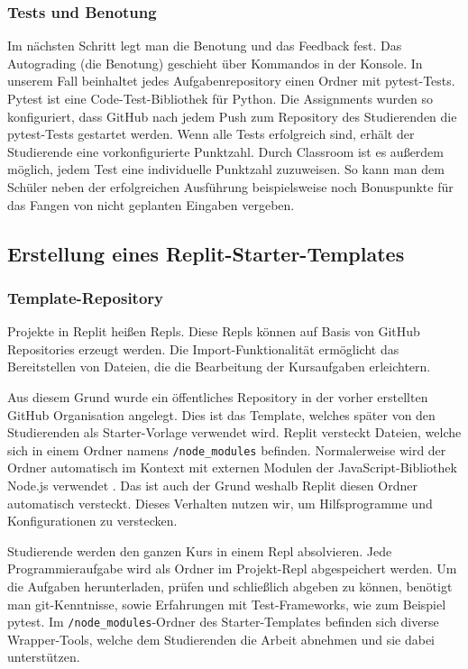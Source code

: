 \subsubsection{Tests und Benotung}
Im nächsten Schritt legt man die Benotung und das Feedback fest. Das Autograding
(die Benotung) geschieht über Kommandos in der Konsole. In unserem Fall
beinhaltet jedes Aufgabenrepository einen Ordner mit pytest-Tests. Pytest ist
eine Code-Test-Bibliothek für Python. Die Assignments wurden so konfiguriert,
dass GitHub nach jedem Push zum Repository des Studierenden die pytest-Tests
gestartet werden. Wenn alle Tests erfolgreich sind, erhält der Studierende eine
vorkonfigurierte Punktzahl. Durch Classroom ist es außerdem möglich, jedem
Test eine individuelle Punktzahl zuzuweisen. So kann man dem Schüler neben der erfolgreichen Ausführung beispielsweise noch Bonuspunkte für das Fangen von
nicht geplanten Eingaben vergeben. \cite{github-assignment-erstellen}

\subsection{Erstellung eines Replit-Starter-Templates}
\subsubsection{Template-Repository}
Projekte in Replit heißen Repls. Diese Repls können auf Basis von GitHub
Repositories erzeugt werden. Die Import-Funktionalität ermöglicht das
Bereitstellen von Dateien, die die Bearbeitung der Kursaufgaben erleichtern.

Aus diesem Grund wurde ein öffentliches Repository in der vorher erstellten
GitHub Organisation angelegt. Dies ist das Template, welches später von den
Studierenden als Starter-Vorlage verwendet wird. Replit versteckt Dateien,
welche sich in einem Ordner namens \texttt{/node\_modules} befinden.
Normalerweise wird der Ordner automatisch im Kontext mit externen Modulen der
JavaScript-Bibliothek Node.js verwendet \cite{nodejs}. Das ist auch der Grund
weshalb Replit diesen Ordner automatisch versteckt. Dieses Verhalten nutzen wir,
um Hilfsprogramme und Konfigurationen zu verstecken.

Studierende werden den ganzen Kurs in einem Repl absolvieren. Jede
Programmieraufgabe wird als Ordner im Projekt-Repl abgespeichert werden. Um die
Aufgaben herunterladen, prüfen und schließlich abgeben zu können, benötigt
man git-Kenntnisse, sowie Erfahrungen mit Test-Frameworks, wie zum Beispiel 
pytest. Im \texttt{/node\_modules}-Ordner des Starter-Templates befinden sich
diverse Wrapper-Tools, welche dem Studierenden die Arbeit abnehmen und sie dabei
unterstützen.


